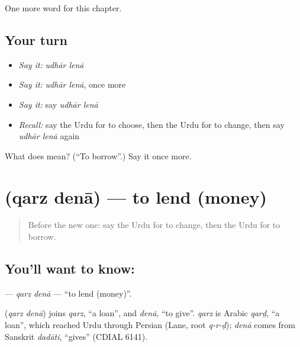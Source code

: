 \begin{grammarlens}[title={What you've built}]
One more word for this chapter.
\end{grammarlens}

\subsection*{Your turn}
\begin{itemize}
\raggedright
  \item \emph{Say it:} \emph{udhār lenā}
  \item \emph{Say it:} \emph{udhār lenā}, once more
  \item \emph{Say it:} say \emph{udhār lenā}
  \item \emph{Recall:} say the Urdu for to choose, then the Urdu for to change, then say \emph{udhār lenā} again
\end{itemize}

\begin{tcolorbox}[breakable,colback=teal!4,colframe=teal!35!black,title={Before you move on}]
What does   mean? (\textquotedblleft{}To borrow\textquotedblright{}.) Say it once more.
\end{tcolorbox}
\section[\texorpdfstring{\ur{قرض} \ur{دینا} (qarz denā)}{قرض دینا (qarz denā)}]{  (qarz denā) — to lend (money)}

\label{lesson:UR-C148-qarz-dena}



\begin{quote}
Before the new one: say the Urdu for to change, then the Urdu for to borrow.
\end{quote}

\subsection*{You'll want to know:  }
\textbf{ } — \emph{qarz denā} — \textquotedblleft{}to lend (money)\textquotedblright{}.

\begin{cousinweb}
\textbf{ } (\emph{qarz denā}) joins \emph{qarz}, \textquotedblleft{}a loan\textquotedblright{}, and \emph{denā}, \textquotedblleft{}to give\textquotedblright{}. \emph{qarz} is Arabic \emph{qarḍ}, \textquotedblleft{}a loan\textquotedblright{}, which reached Urdu through Persian (Lane, root \emph{q-r-ḍ}); \emph{denā} comes from Sanskrit \emph{dadāti}, \textquotedblleft{}gives\textquotedblright{} (CDIAL 6141).
\end{cousinweb}


